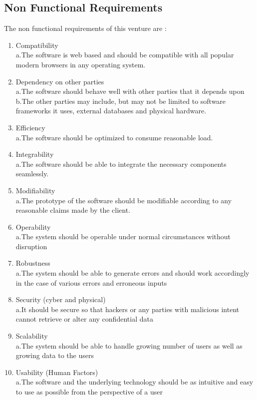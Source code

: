 \documentclass[12pt]{extarticle}
\begin{document}
	\subsection{Non Functional Requirements}
		The non functional requirements of this venture are :
		
		\begin{enumerate}
			
			
			\item Compatibility
\\
			a.The software is web based and should be compatible with all popular modern browsers in any operating system.
			
			\item Dependency on other parties
\\
			a.The software should behave well with other parties that it depends upon
\\
			b.The other parties may include, but may not be limited to software frameworks it uses, external databases and physical hardware.
			\item Efficiency 
\\
			a.The software should be optimized to consume reasonable load.
			
			\item Integrability 
\\
			a.The software should be able to integrate the necessary components seamlessly.
			
			\item Modifiability
\\
			a.The prototype of the software should be modifiable according to any reasonable claims made by the client.
			\item Operability
\\
			a.The system should be operable under normal circumstances without disruption
			
			
			\item Robustness
\\
			a.The system should be able to generate errors and should work accordingly in the case of various errors and erroneous inputs
			\item Security (cyber and physical) \\
			a.It should be secure so that hackers or any parties with malicious intent cannot retrieve or alter any confidential data
			\item Scalability 
\\
			a.The system should be able to handle growing number of users as well as growing data to the users
			\item Usability (Human Factors) \\ 
			a.The software and the underlying technology should be as intuitive and easy to use as possible from the perspective of a user
		\end{enumerate}
		
\end{document}
